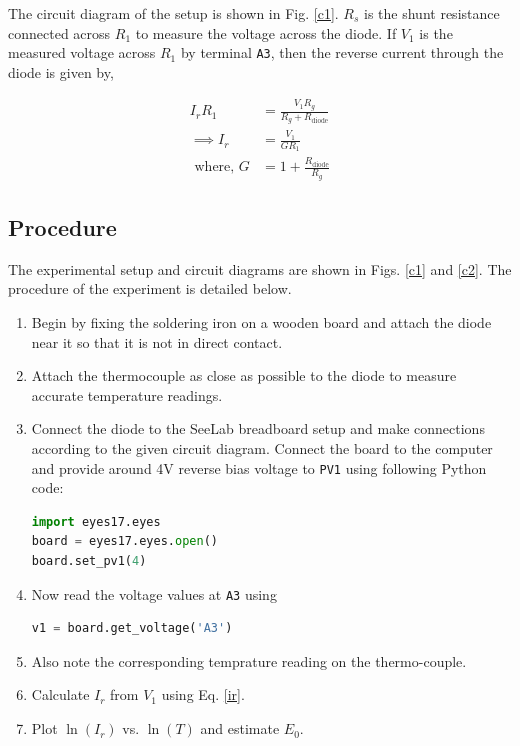 The circuit diagram of the setup is shown in Fig. \ref{c1}. $R_s$ is the shunt resistance connected across $R_1$ to measure the voltage across the diode. If $V_1$ is the measured voltage across $R_1$ by terminal \verb|A3|, then the reverse current through the diode is given by,

\begin{align} \label{ir}
    I_r R_1 &= \frac{V_1 R_g}{R_g + R_\text{diode}} \nonumber\\
    \implies I_r &= \frac{V_1}{GR_1}\\\text{ where, } G &= 1+ \frac{R_\text{diode}}{R_g} \nonumber
\end{align}

\subsection{Procedure}
The experimental setup and circuit diagrams are shown in Figs. \ref{c1} and \ref{c2}. The procedure of the experiment is detailed below.\\

\begin{enumerate}
    \item Begin by fixing the soldering iron on a wooden board and attach the diode near it so that it is not in direct contact.
    \item Attach the thermocouple as close as possible to the diode to measure accurate temperature readings.
    \item Connect the diode to the SeeLab breadboard setup and make connections according to the given circuit diagram. Connect the board to the computer and provide around 4V reverse bias voltage to \verb|PV1| using following Python code:
    \begin{lstlisting}[language=Python]
import eyes17.eyes
board = eyes17.eyes.open()
board.set_pv1(4)
\end{lstlisting}        
    \item Now read the voltage values at \verb|A3| using  
    \begin{lstlisting}[language=Python]
v1 = board.get_voltage('A3')
\end{lstlisting}  
\item Also note the corresponding temprature reading on the thermo-couple.
    \item Calculate $I_r$ from $V_1$ using Eq. \ref{ir}.
    \item Plot $\ln(I_r)$ vs. $\ln(T)$ and estimate $E_0$.
\end{enumerate}